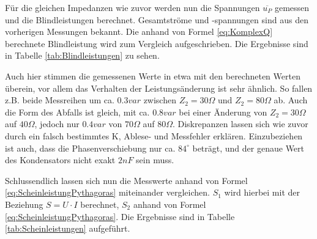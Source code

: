 Für die gleichen Impedanzen wie zuvor werden nun die Spannungen $\overline{u_P}$ gemessen und die Blindleistungen berechnet. Gesamtströme und -spannungen sind aus den vorherigen Messungen bekannt. Die anhand von Formel \eqref{eq:KomplexQ} berechnete Blindleistung wird zum Vergleich aufgeschrieben. Die Ergebnisse sind in Tabelle \ref{tab:Blindleistungen} zu sehen.

Auch hier stimmen die gemessenen Werte in etwa mit den berechneten Werten überein, vor allem das Verhalten der Leistungsänderung ist sehr ähnlich. So fallen z.B. beide Messreihen um ca. $0.3var$ zwischen $Z_2=30\Omega$ und $Z_2=80\Omega$ ab. Auch die Form des Abfalls ist gleich, mit ca. $0.8var$ bei einer Änderung von $Z_2=30\Omega$ auf $40\Omega$, jedoch nur $0.4var$ von $70\Omega$ auf $80\Omega$. Diskrepanzen lassen sich wie zuvor durch ein falsch bestimmtes K, Ablese- und Messfehler erklären. Einzubeziehen ist auch, dass die Phasenverschiebung nur ca. $84^\circ$ beträgt, und der genaue Wert des Kondensators nicht exakt $2nF$ sein muss.

Schlussendlich lassen sich nun die Messwerte anhand von Formel \eqref{eq:ScheinleistungPythagoras} miteinander vergleichen. $S_1$ wird hierbei mit der Beziehung $S=U\cdot I$ berechnet, $S_2$ anhand von Formel \eqref{eq:ScheinleistungPythagoras}. Die Ergebnisse sind in Tabelle \ref{tab:Scheinleistungen} aufgeführt.